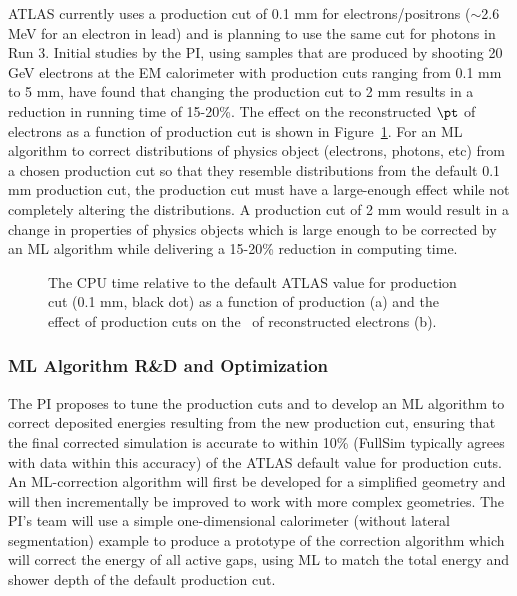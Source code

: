 \documentclass[letter, USenglish, 11pt, subfigure]{article}
\begin{document}
ATLAS currently uses a production cut of 0.1 mm for electrons/positrons ($\sim$2.6 MeV for an electron in lead) %
and is planning to use the same cut for photons in Run 3. Initial studies by the PI, using samples that are produced by shooting 20 GeV electrons at the EM calorimeter with production cuts ranging from 0.1 mm to 5 mm, have found that changing the production cut to 2 mm results in a reduction in running time of 15-20\%. The effect on the reconstructed $\pt$ of electrons as a function of production cut is shown in Figure~\ref{fig:simpleCorr}. For an ML algorithm to correct distributions of physics object (electrons, photons, etc) from a chosen production cut so that they resemble distributions from the default 0.1 mm production cut, the production cut must have a large-enough effect while not completely altering the distributions. A production cut of 2 mm would result in a change in properties of physics objects which is large enough to be corrected by an ML algorithm while delivering a 15-20\% reduction in computing time.

\begin{figure}[!htbp]
  \caption{\label{fig:simpleCorr}The CPU time relative to the default ATLAS value for production cut (0.1 mm, black dot) as a function of production (a) and the effect of production cuts on the \pt\ of reconstructed electrons (b).}
\end{figure}


\subsubsection{ML Algorithm R\&D and Optimization}
The PI proposes to tune the production cuts and to develop an ML algorithm to correct deposited energies resulting from the new production cut, ensuring that the final corrected simulation is accurate to within 10\% (FullSim typically agrees with data within this accuracy) of the ATLAS default value for production cuts. An ML-correction algorithm will first be developed for a simplified geometry and will then incrementally be improved to work with more complex geometries. The PI's team will use a simple one-dimensional calorimeter  (without lateral segmentation) example to produce a prototype of the correction algorithm which will correct the energy of all active gaps, using ML to match the total energy and shower depth of the default production cut. 
\end{document}
